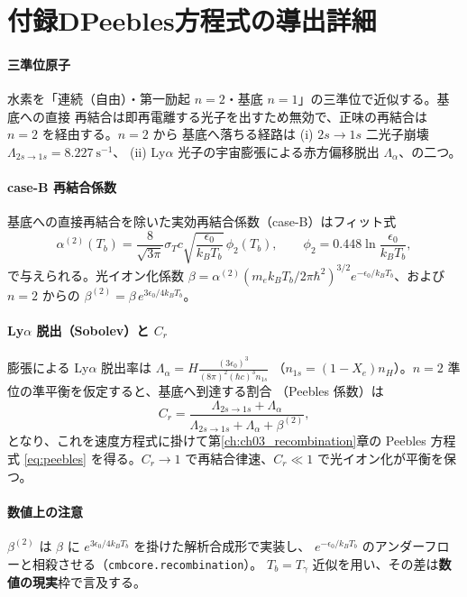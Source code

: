 \section*{付録D\quad Peebles方程式の導出詳細}

\paragraph{三準位原子}
水素を「連続（自由）・第一励起 $n=2$・基底 $n=1$」の三準位で近似する。基底への直接
再結合は即再電離する光子を出すため無効で、正味の再結合は $n=2$ を経由する。$n=2$ から
基底へ落ちる経路は (i) $2s\to1s$ 二光子崩壊 $\Lambda_{2s\to1s}=8.227~\mathrm{s^{-1}}$、
(ii) Ly$\alpha$ 光子の宇宙膨張による赤方偏移脱出 $\Lambda_\alpha$、の二つ。

\paragraph{case-B 再結合係数}
基底への直接再結合を除いた実効再結合係数（case-B）はフィット式
\begin{equation}
  \alpha^{(2)}(T_b)=\frac{8}{\sqrt{3\pi}}\sigma_Tc\sqrt{\frac{\epsilon_0}{k_BT_b}}\,
  \phi_2(T_b),\qquad \phi_2=0.448\ln\!\frac{\epsilon_0}{k_BT_b},
\end{equation}
で与えられる。光イオン化係数 $\beta=\alpha^{(2)}(m_ek_BT_b/2\pi\hbar^2)^{3/2}
e^{-\epsilon_0/k_BT_b}$、および $n=2$ からの $\beta^{(2)}=\beta\,e^{3\epsilon_0/4k_BT_b}$。

\paragraph{Ly$\alpha$ 脱出（Sobolev）と $C_r$}
膨張による Ly$\alpha$ 脱出率は
$\Lambda_\alpha=H\frac{(3\epsilon_0)^3}{(8\pi)^2(\hbar c)^3 n_{1s}}$
（$n_{1s}=(1-X_e)n_H$）。$n=2$ 準位の準平衡を仮定すると、基底へ到達する割合
（Peebles 係数）は
\begin{equation}
  C_r=\frac{\Lambda_{2s\to1s}+\Lambda_\alpha}{\Lambda_{2s\to1s}+\Lambda_\alpha+\beta^{(2)}},
\end{equation}
となり、これを速度方程式に掛けて第\ref{ch:ch03_recombination}章の Peebles 方程式
\eqref{eq:peebles} を得る。$C_r\to1$ で再結合律速、$C_r\ll1$ で光イオン化が平衡を保つ。

\paragraph{数値上の注意}
$\beta^{(2)}$ は $\beta$ に $e^{3\epsilon_0/4k_BT_b}$ を掛けた解析合成形で実装し、
$e^{-\epsilon_0/k_BT_b}$ のアンダーフローと相殺させる（\texttt{cmbcore.recombination}）。
$T_b=T_\gamma$ 近似を用い、その差は\textbf{数値の現実}枠で言及する。
